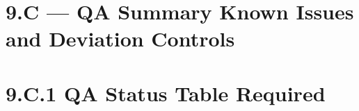 \documentclass[10pt]{article}
\begin{document}
\begin{landscape}
\section*{9.C — QA Summary Known Issues and Deviation Controls}
{}


\section*{9.C.1 QA Status Table Required}
{}

\begingroup
\scriptsize
\setlength{\tabcolsep}{2pt}
\renewcommand{\arraystretch}{1.12}


\end{landscape}
\end{document}
